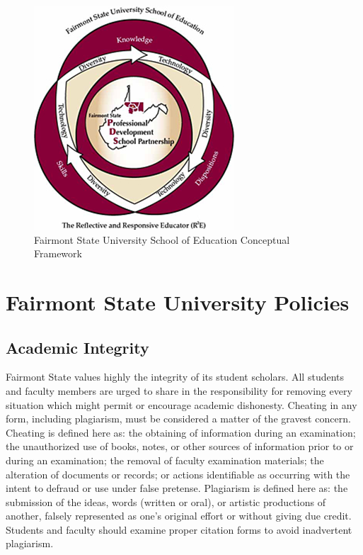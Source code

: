 \documentclass{tufte-handout}
\begin{document}
\begin{center}
\begin{figure}%
  \centerline{\includegraphics[width=0.5\linewidth]{fsu-cf.png}}
  \caption{Fairmont State University School of Education Conceptual Framework}
  \label{fig:fsu-cf}
\end{figure}
\end{center}

\section{Fairmont State University Policies}

\subsection{Academic Integrity}

Fairmont State values highly the integrity of its student scholars. All students and faculty members are urged to share in the responsibility for removing every situation which might permit or encourage academic dishonesty. Cheating in any form, including plagiarism, must be considered a matter of the gravest concern. Cheating is defined here as: the obtaining of information during an examination; the unauthorized use of books, notes, or other sources of information prior to or during an examination; the removal of faculty examination materials; the alteration of documents or records; or actions identifiable as occurring with the intent to defraud or use under false pretense. Plagiarism is defined here as: the submission of the ideas, words (written or oral), or artistic productions of another, falsely represented as one's original effort or without giving due credit. Students and faculty should examine proper citation forms to avoid inadvertent plagiarism.
\end{document}
